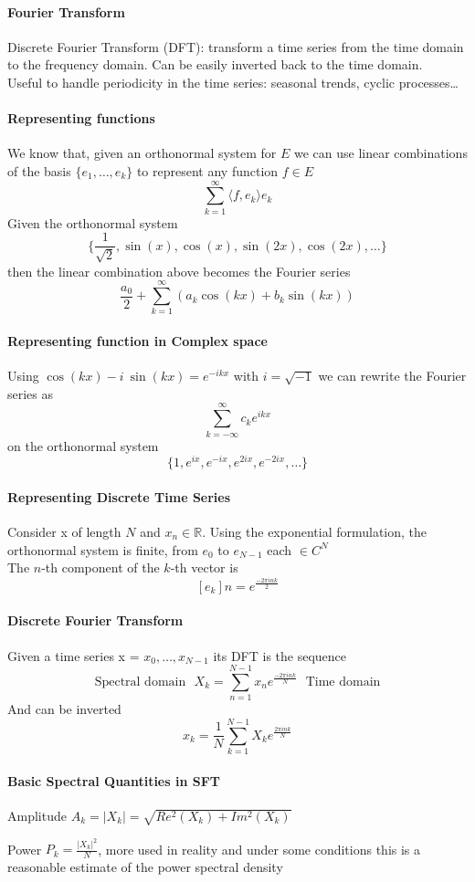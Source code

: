 \documentclass[10pt]{report}
\begin{document}
\paragraph{Fourier Transform} Discrete Fourier Transform (DFT): transform a time series from the time domain to the frequency domain. Can be easily inverted back to the time domain.\\
Useful to handle periodicity in the time series: seasonal trends, cyclic processes\ldots
\paragraph{Representing functions} We know that, given an orthonormal system for $E$ we can use linear combinations of the basis $\{e_1,\ldots,e_k\}$ to represent any function $f\in E$ $$\sum_{k=1}^\infty \langle f,e_k\rangle e_k$$
Given the orthonormal system $$\{\frac{1}{\sqrt{2}}, \sin(x),\cos(x),\sin(2x),\cos(2x),\ldots\}$$
then the linear combination above becomes the Fourier series 
$$\frac{a_0}{2}+\sum_{k=1}^\infty\left(a_k\cos(kx)+b_k\sin(kx)\right)$$
\paragraph{Representing function in Complex space} Using $\cos(kx)-i\:\sin(kx) = e^{-ikx}$ with $i=\sqrt{-1}$ we can rewrite the Fourier series as $$\sum_{k=-\infty}^\infty c_k e^{ikx}$$
on the orthonormal system $$\{1,e^{ix},e^{-ix},e^{2ix},e^{-2ix},\ldots\}$$
\paragraph{Representing Discrete Time Series} Consider x of length $N$ and $x_n\in \mathbb{R}$. Using the exponential formulation, the orthonormal system is finite, from $e_0$ to $e_{N-1}$ each $\in C^N$\\
The $n$-th component of the $k$-th vector is $$[e_k]n=e^{\frac{-2\pi ink}{2}}$$
\paragraph{Discrete Fourier Transform} Given a time series x = $x_0,\ldots,x_{N-1}$ its DFT is the sequence $$\text{Spectral domain}\:\:\:X_k = \sum_{n=1}^{N-1}x_ne^{\frac{-2\pi ink}{N}}\:\:\:\text{Time domain}$$
And can be inverted $$x_k = \frac{1}{N}\sum_{k=1}^{N-1}X_ke^{\frac{2\pi ink}{N}}$$
\paragraph{Basic Spectral Quantities in SFT}
\begin{list}{}{}
	\item Amplitude $A_k = |X_k| = \sqrt{Re^2(X_k)+Im^2(X_k)}$
	\item Power $P_k = \frac{|X_k|^2}{N}$, more used in reality and under some conditions this is a reasonable estimate of the power spectral density
\end{list}
\end{document}
